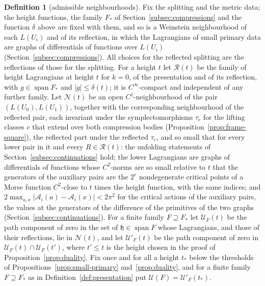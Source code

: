 \documentclass[11pt]{amsart}
\theoremstyle{definition}
\newtheorem{definition}[theorem]{Definition}
\theoremstyle{remark}
\theoremstyle{plain}
\numberwithin{equation}{section}
\begin{document}
\begin{definition}[admissible neighbourhoods]\label{def:admissible-nbhd}
Fix the splitting and the metric data; the height functions, the family $F_*$ of
Section~\ref{subsec:compressions} and the function $\delta$ above are fixed with them, and so is
a Weinstein neighbourhood of each $L(U_i)$ and of its reflection, in which the Lagrangians of
small primary data are graphs of differentials of functions over $L(U_i)$
(Section~\ref{subsec:compressions}). All choices for the reflected splitting are the
reflections of those for the splitting. For a height $t$ let $\mathcal R(t)$ be the family of
height Lagrangians at height $t$ for $k=0$, of the presentation and of its reflection, with
$g\in\operatorname{span}F_*$ and $|g|\le\delta(t)$; it is $C^\infty$-compact and independent of
any further family. Let $\mathcal N(t)$ be an open $C^1$-neighbourhood of the pair
$(L(U_0),L(U_1))$, together with the corresponding neighbourhood of the reflected pair, each
invariant under the symplectomorphisms $\tau_c$ for the lifting classes $c$ that extend over
both compression bodies (Proposition~\ref{prop:frame-square}), the reflected part under the
reflected $\tau_c$, and so small that for every
lower pair in it and every $R\in\mathcal R(t)$: the unfolding statements of
Section~\ref{subsec:continuations} hold; the lower Lagrangians are graphs of differentials of
functions whose $C^2$-norms are so small relative to $t$ that the generators of the auxiliary
pairs are the $2^r$ nondegenerate critical points of a Morse function $C^2$-close to $t$ times
the height function, with the same indices; and
$2\max_{a,x}|\mathcal A_i(a)-\mathcal A_i(x)|<2\pi^2$ for the critical actions of the auxiliary
pairs, the values at the generators of the difference of the primitives of the two graphs
(Section~\ref{subsec:continuations}). For a finite family $F\supseteq F_*$ let $\mathcal U_F(t)$
be the path component of zero in the set of $\mathfrak h\in\operatorname{span}F$ whose
Lagrangians, and those of their reflections, lie in $\mathcal N(t)$, and let $\mathcal U'_F(t)$
be the path component of zero in $\mathcal U_F(t)\cap\mathcal U_F(t')$, where $t'\le t$ is the
height chosen in the proof of Proposition~\ref{prop:duality}. Fix once and for all a height
$t_*$ below the thresholds of Propositions~\ref{prop:small-primary} and~\ref{prop:duality}, and
for a finite family $F\supseteq F_*$ as in Definition~\ref{def:presentation} put
$\mathcal U(F)=\mathcal U'_F(t_*)$.
\end{definition}
\end{document}
